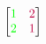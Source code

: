 \documentclass[preview]{standalone}
\begin{document}
\begin{align*}
\begin{bmatrix} {\color{green}1} & {\color{purple}2} \\ {\color{green}2} & {\color{purple}1} \end{bmatrix}
\end{align*}
\end{document}
